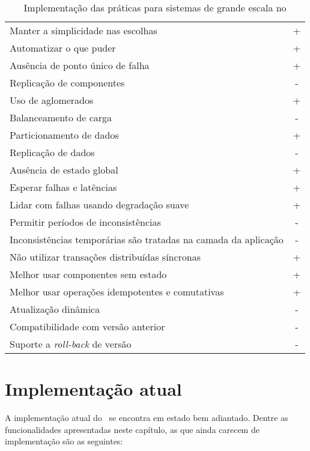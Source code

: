 \begin{table}[!t]
\begin{center}
    \begin{tabular}{l c}
	 \hline
Manter a simplicidade nas escolhas & +\\
Automatizar o que puder & + \\
Ausência de ponto único de falha & + \\
Replicação de componentes & - \\
Uso de aglomerados & + \\
Balanceamento de carga & - \\
Particionamento de dados & + \\
Replicação de dados & - \\
Ausência de estado global & +  \\%
Esperar falhas e latências & +  \\
Lidar com falhas usando degradação suave & + \\
Permitir períodos de inconsistências & - \\
Inconsistências temporárias são tratadas na camada da aplicação & - \\
Não utilizar transações distribuídas síncronas & + \\
Melhor usar componentes sem estado  & + \\%
Melhor usar operações idempotentes e comutativas  & +\\
Atualização dinâmica  & -\\
Compatibilidade com versão anterior  & -\\
Suporte a \emph{roll-back} de versão & - \\
	 \hline
    \end{tabular}
  \caption{Implementação das práticas para sistemas de grande escala no \ee}
  \label{tab:escala_ee}
\end{center}
\end{table}

\section{Implementação atual}
\label{sec:impl_atual}

A implementação atual do \ee\ se encontra em estado bem adiantado. Dentre as funcionalidades apresentadas neste capítulo, as que ainda carecem de implementação são as seguintes:

